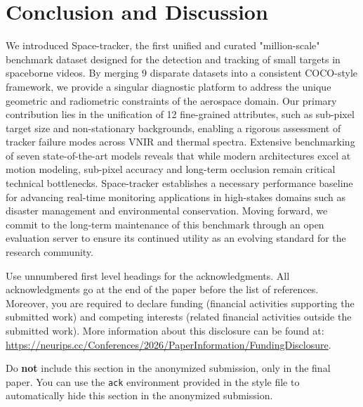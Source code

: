 \documentclass{article}
\begin{document}
\begin{table}[t]
  \centering
  \caption{Multi-Object Tracking results on Space-Tracker-MOT, split by detector
  family. The \textbf{left half} reports the car-only setting, pooled across
  RsCarData, SAT-MTB-car, and SDM-Car, all driven by a shared HiEUM detection
  cache. The \textbf{right half} reports the airplane / ship / train setting,
  pooled across SAT-MTB (test split, held out from detector training), VISO,
  and AIR-MOT-100, all driven by a shared Faster~R-CNN. Rate metrics (HOTA,
  DetA, AssA, MOTA, IDF1) are macro-averaged across the constituent splits;
  count metrics (IDsw, MT, ML) are summed. $\uparrow$~higher is better,
  $\downarrow$~lower is better. \textbf{Bold} = best, \underline{underline} =
  second best within each column, computed independently within each half.}
  \label{tab:mot_results_combined}
  
\end{table}

\section{Conclusion and Discussion}
We introduced Space-tracker, the first unified and curated "million-scale"
benchmark dataset designed for the detection and tracking of small targets in
spaceborne videos. By merging 9 disparate datasets into a consistent COCO-style
framework, we provide a singular diagnostic platform to address the unique
geometric and radiometric constraints of the aerospace domain. Our primary
contribution lies in the unification of 12 fine-grained attributes, such as
sub-pixel target size and non-stationary backgrounds, enabling a rigorous
assessment of tracker failure modes across VNIR and thermal spectra. Extensive
benchmarking of seven state-of-the-art models reveals that while modern
architectures excel at motion modeling, sub-pixel accuracy and long-term
occlusion remain critical technical bottlenecks. Space-tracker establishes a
necessary performance baseline for advancing real-time monitoring applications
in high-stakes domains such as disaster management and environmental
conservation. Moving forward, we commit to the long-term maintenance of this
benchmark through an open evaluation server to ensure its continued utility as
an evolving standard for the research community.


\begin{ack}
Use unnumbered first level headings for the acknowledgments. All acknowledgments
go at the end of the paper before the list of references. Moreover, you are
required to declare funding (financial activities supporting the submitted work)
and competing interests (related financial activities outside the submitted
work). More information about this disclosure can be found at:
\url{https://neurips.cc/Conferences/2026/PaperInformation/FundingDisclosure}.


Do {\bf not} include this section in the anonymized submission, only in the
final paper. You can use the \texttt{ack} environment provided in the style file
to automatically hide this section in the anonymized submission.
\end{ack}
\end{document}
